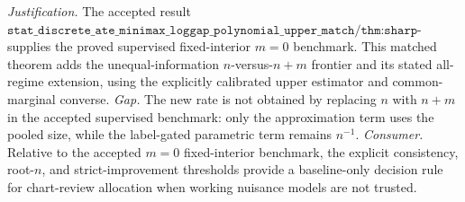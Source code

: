 \documentclass{article}
\begin{document}
\par\smallskip\noindent \textit{Justification.} The accepted result \(\texttt{stat\_discrete\_ate\_minimax\_loggap\_polynomial\_upper\_match/thm:sharp-minimax-fixed-interior}\) supplies the proved supervised fixed-interior \(m=0\) benchmark. This matched theorem adds the unequal-information \(n\)-versus-\(n+m\) frontier and its stated all-regime extension, using the explicitly calibrated upper estimator and common-marginal converse. \textit{Gap.} The new rate is not obtained by replacing \(n\) with \(n+m\) in the accepted supervised benchmark: only the approximation term uses the pooled size, while the label-gated parametric term remains \(n^{-1}\). \textit{Consumer.} Relative to the accepted \(m=0\) fixed-interior benchmark, the explicit consistency, root-\(n\), and strict-improvement thresholds provide a baseline-only decision rule for chart-review allocation when working nuisance models are not trusted.
\end{document}
